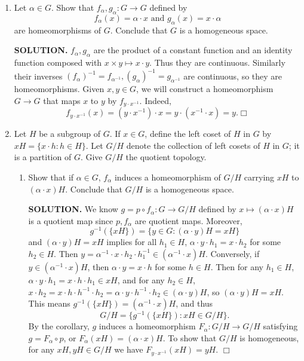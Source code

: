 \documentclass{article}
\begin{document}
\begin{enumerate}
    \item Let $\alpha \in G$. Show that $f_\alpha, g_\alpha: G \rightarrow G$ defined by
    $$f_\alpha(x) = \alpha \cdot x \text{ and } g_\alpha(x) = x \cdot \alpha$$
    are homeomorphisms of $G$. Conclude that $G$ is a homogeneous space.

    {\bf SOLUTION.} $f_\alpha, g_\alpha$ are the product of a constant function and an identity function composed with $x \times y \mapsto x \cdot y$. Thus they are continuous. Similarly their inverses $(f_\alpha)^{-1} = f_{\alpha^{-1}}, (g_\alpha)^{-1} = g_{\alpha^{-1}}$ are continuous, so they are homeomorphisms. Given $x, y \in G$, we will construct a homeomorphism $G \rightarrow G$ that maps $x$ to $y$ by $f_{y \cdot x^{-1}}$. Indeed, $$f_{y \cdot x^{-1}}(x) = (y \cdot x^{-1}) \cdot x = y \cdot (x^{-1} \cdot x) = y. \Box$$

    \item Let $H$ be a subgroup of $G$. If $x \in G$, define the left coset of $H$ in $G$ by $xH = \{x \cdot h: h \in H\}$. Let $G / H$ denote the collection of left cosets of $H$ in $G$; it is a partition of $G$. Give $G / H$ the quotient topology.
    \begin{enumerate}
        \item Show that if $\alpha \in G$, $f_\alpha$ induces a homeomorphism of $G / H$ carrying $xH$ to $(\alpha \cdot x) H$. Conclude that $G / H$ is a homogeneous space.

        {\bf SOLUTION.} We know $g = p \circ f_\alpha: G \rightarrow G / H$ defined by $x \mapsto (\alpha \cdot x)H$ is a quotient map since $p, f_\alpha$ are quotient maps. Moreover,
        $$g^{-1}(\{xH\}) = \{y \in G: (\alpha \cdot y)H = xH\}$$
        and $(\alpha \cdot y)H = xH$ implies for all $h_1 \in H$, $\alpha \cdot y \cdot h_1 = x \cdot h_2$ for some $h_2 \in H$. Then $y = \alpha^{-1} \cdot x \cdot h_2 \cdot h_1^{-1} \in (\alpha^{-1} \cdot x)H$. Conversely, if $y \in (\alpha^{-1} \cdot x)H$, then $\alpha \cdot y = x \cdot h$ for some $h \in H$. Then for any $h_1 \in H$, $\alpha \cdot y \cdot h_1 = x \cdot h \cdot h_1 \in xH$, and for any $h_2 \in H$, $x \cdot h_2 = x \cdot h \cdot h^{-1} \cdot h_2 = \alpha \cdot y \cdot h^{-1} \cdot h_2 \in (\alpha \cdot y)H$, so $(\alpha \cdot y)H = xH$. This means $g^{-1}(\{xH\}) = (\alpha^{-1} \cdot x)H$, and thus
        $$G / H = \{g^{-1}(\{xH\}): xH \in G / H\}.$$
        By the corollary, $g$ induces a homeomorphism $F_\alpha: G / H \rightarrow G / H$ satisfying $g = F_\alpha \circ p$, or $F_\alpha(xH) = (\alpha \cdot x)H$. To show that $G / H$ is homogeneous, for any $xH, yH \in G / H$ we have $F_{y \cdot x^{-1}}(xH) = yH$. $\Box$


\end{enumerate}
\end{enumerate}
\end{document}
